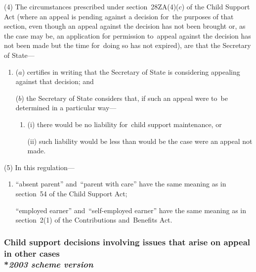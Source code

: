 \documentclass[12pt,a4paper]{article}
\begin{document}
(4) The circumstances prescribed under section~28ZA(4)($c$) of the Child Support Act (where an appeal is pending against a decision for~the purposes of that section, even though an appeal against the decision has not been brought or, as the case may be, an application for 
permission  %
to~appeal against the decision has not been made but the time for~doing so has not expired), are that the Secretary of State—
\begin{enumerate}\item[]
($a$) certifies in writing that 
the Secretary of State  %
is considering appealing against that decision; and

($b$) 
the Secretary of State  %
considers that, if such an appeal were to~be determined in a particular way—
\begin{enumerate}\item[]
(i) there would be no liability for~child support maintenance, or

(ii) such liability would be less than would be the case were an appeal not made.
\end{enumerate}
\end{enumerate}

(5) In this regulation—
\begin{enumerate}\item[]
“absent parent” and~“parent with care” have the same meaning as in section~54 of the Child Support Act;

“employed earner” and~“self-employed earner” have the same meaning as in section~2(1) of the Contributions and~Benefits Act.
\end{enumerate}


\subsubsection[23. Child support decisions involving issues that arise on appeal in other cases --- \emph{2003 scheme version}]{Child support decisions involving issues that arise on appeal in other cases\\*\emph{2003 scheme version}}
\end{document}
